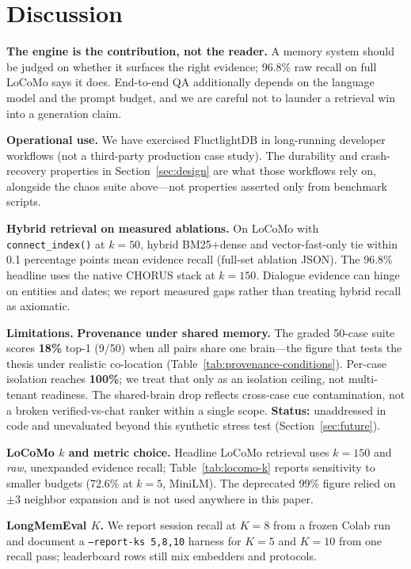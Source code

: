 \documentclass[11pt]{article}
\begin{document}
\section{Discussion}
\textbf{The engine is the contribution, not the reader.} A memory system should be
judged on whether it surfaces the right evidence; 96.8\% raw recall on full LoCoMo
says it does. End-to-end QA additionally depends on the language model and the prompt
budget, and we are careful not to launder a retrieval win into a generation claim.

\textbf{Operational use.} We have exercised FluctlightDB in long-running developer
workflows (not a third-party production case study). The durability and crash-recovery
properties in Section~\ref{sec:design} are what those workflows rely on, alongside
the chaos suite above---not properties asserted only from benchmark scripts.

\textbf{Hybrid retrieval on measured ablations.} On LoCoMo with
\texttt{connect\_index()} at $k{=}50$, hybrid BM25+dense and vector-fast-only
tie within 0.1 percentage points mean evidence recall (full-set ablation JSON).
The 96.8\% headline uses the native CHORUS stack at $k{=}150$. Dialogue evidence can hinge
on entities and dates; we report measured gaps rather than treating hybrid recall
as axiomatic.

\textbf{Limitations.}
\textbf{Provenance under shared memory.} The graded 50-case suite scores
\textbf{18\%} top-1 (9/50) when all pairs share one brain---the figure that tests
the thesis under realistic co-location (Table~\ref{tab:provenance-conditions}).
Per-case isolation reaches \textbf{100\%}; we treat that only as an isolation
ceiling, not multi-tenant readiness. The shared-brain drop reflects cross-case
cue contamination, not a broken verified-vs-chat ranker within a single scope.
\textbf{Status:} unaddressed in code and unevaluated beyond this synthetic stress
test (Section~\ref{sec:future}).

\textbf{LoCoMo $k$ and metric choice.} Headline LoCoMo retrieval uses $k{=}150$
and \emph{raw}, unexpanded evidence recall; Table~\ref{tab:locomo-k} reports
sensitivity to smaller budgets (72.6\% at $k{=}5$, MiniLM). The deprecated 99\%
figure relied on $\pm3$ neighbor expansion and is not used anywhere in this paper.

\textbf{LongMemEval $K$.} We report session recall at $K{=}8$ from a frozen Colab
run and document a \texttt{--report-ks 5,8,10} harness for $K{=}5$ and $K{=}10$
from one recall pass; leaderboard rows still mix embedders and protocols.
\end{document}

